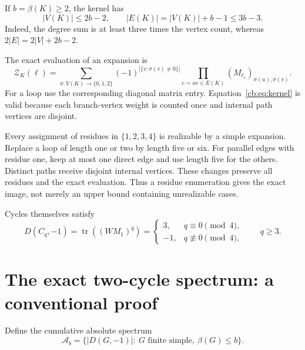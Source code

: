 \documentclass[11pt]{article}
\numberwithin{equation}{section}
\theoremstyle{definition}
\newcommand{\tr}{\operatorname{tr}}
\begin{document}
If $b=\beta(K)\ge2$, the kernel has
\begin{equation}\label{cb:eq:kernelsize}
 |V(K)|\le2b-2,\qquad |E(K)|=|V(K)|+b-1\le3b-3.
\end{equation}
Indeed, the degree sum is at least three times the vertex count, whereas
$2|E|=2|V|+2b-2$.

The exact evaluation of an expansion is
\begin{equation}\label{cb:eq:kernel}
 \mathcal Z_K(\boldsymbol\ell)=
 \sum_{\sigma:V(K)\to\{0,1,2\}}
 (-1)^{|\{v:\sigma(v)\ne0\}|}
 \prod_{e=uv\in E(K)}(M_{\ell_e})_{\sigma(u),\sigma(v)}.
\end{equation}
For a loop use the corresponding diagonal matrix entry. Equation~\eqref{cb:eq:kernel}
is valid because each branch-vertex weight is counted once and internal
path vertices are disjoint.

Every assignment of residues in $\{1,2,3,4\}$ is realizable by a simple
expansion. Replace a loop of length one or two by length five or six.
For parallel edges with residue one, keep at most one direct edge and
use length five for the others. Distinct paths receive disjoint internal
vertices. These changes preserve all residues and the exact evaluation.
Thus a residue enumeration gives the exact image, not merely an upper bound
containing unrealizable cases.

Cycles themselves satisfy
\begin{equation}\label{cb:eq:cyclevalue}
 D(C_q,-1)=\tr((WM_1)^q)=
 \begin{cases}3,&q\equiv0\pmod4,\\-1,&q\not\equiv0\pmod4,\end{cases}
 \qquad q\ge3.
\end{equation}

\section{The exact two-cycle spectrum: a conventional proof}\label{cb:sec:bicyclic}

Define the cumulative absolute spectrum
\[
 \mathcal A_b=\{|D(G,-1)|:\ G\text{ finite simple},\ \beta(G)\le b\}.
\]
\end{document}
